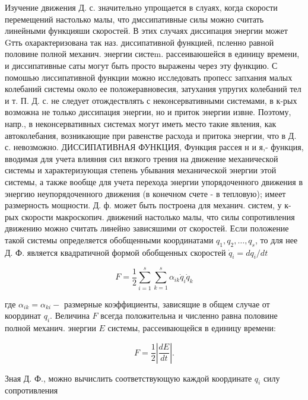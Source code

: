 \documentclass[10pt]{article}
\begin{document}
Изучение движения Д. с. значительно упрощается в слуаях, когда скорости перемещений настолько малы, что дмссипативные силы можно считать линейными функцияши скоростей. В этих случаях диссипация энергии может Gтть охарактеризована так наз. диссипативной функцией, псленно равной половине полной механич. энергии систеm. рассеиваюшейся в единицу времени, и диссипативные саты могут быть просто выражены через эту функцию. С помошью лиссипативной функции можно исследовать пропесс запхания малых колебаний системы около ее положеравновесия, затухания упругих колебаний тел и т. П. Д. с. не следует отождествлять с неконсервативными системами, в к-рых возможна не только диссипация энергии, но и приток энергии извне. Поэтому, напр., в неконсервативных системах могут иметь место такие явления, как автоколебания, возникающие при равенстве расхода и притока энергии, что в Д. с. невозможно. ДИССИПАТИВНАЯ ФУНКЦИЯ, Функция рассея н и я,- функция, вводимая для учета влияния сил вязкого трения на движение механической системы и характеризующая степень убывания механической энергии этой системы, а также вообще для учета перехода энергии упорядоченного движения в энергию неупорядоченного движения (в конечном счете - в тепловую); имеет размерность мощности. Д. ф. может быть построена для механич. систем, у к-рых скорости макроскопич. движений настолько малы, что силы сопротивления движению можно считать линейно зависяшими от скоростей. Если положение такой системы определяется обобщенными координатами $q_{1}, q_{2}, \ldots, q_{s}$, то для нее Д. Ф. является квадратичной формой обобщенных скоростей $\dot{q}_{i}=d q_{i} / d t$



\[

F=\frac{1}{2} \sum_{i=1}^{s} \sum_{k=1}^{s} \alpha_{i k} \dot{q}_{i} \dot{q}_{k}

\]



где $\alpha_{i k}=\alpha_{k i}-$ размерные коэффициенты, зависящие в общем случае от координат $q_{i}$. Величина $F$ всегда положительна и численно равна половине полной механич. энергии $E$ системы, рассеивающейся в единицу времени:



\[

F=\frac{1}{2}\left|\frac{d E}{d t}\right| .

\]



Зная Д. Ф., можно вычислить соответствующую каждой координате $q_{i}$ силу сопротивления
\end{document}
